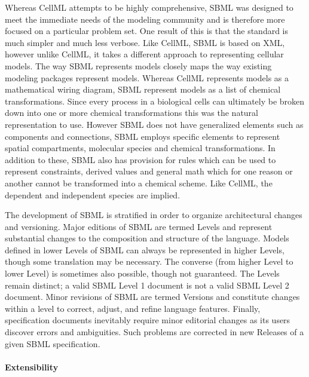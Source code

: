 Whereas CellML attempts to be highly comprehensive, SBML was designed to
meet the immediate needs of the modeling community and is therefore more
focused on a particular problem set. One result of this is that the
standard is much simpler and much less verbose. Like CellML, SBML is
based on XML, however unlike CellML, it takes a different approach to
representing cellular models. The way SBML represents models closely
maps the way existing modeling packages represent models. Whereas CellML
represents models as a mathematical wiring diagram, SBML represent
models as a list of chemical transformations. Since every process in a
biological cells can ultimately be broken down into one or more chemical
transformations this was the natural representation to use. However SBML
does not have generalized elements such as components and connections,
SBML employs specific elements to represent spatial compartments,
molecular species and chemical transformations. In addition to these,
SBML also has provision for rules which can be used to represent
constraints, derived values and general math which for one reason or
another cannot be transformed into a chemical scheme. Like CellML, the
dependent and independent species are implied.

The development of SBML is stratified in order to organize architectural
changes and versioning. Major editions of SBML are termed Levels and
represent substantial changes to the composition and structure of the
language. Models defined in lower Levels of SBML can always be
represented in higher Levels, though some translation may be necessary.
The converse (from higher Level to lower Level) is sometimes also
possible, though not guaranteed. The Levels remain distinct; a valid
SBML Level 1 document is not a valid SBML Level 2 document. Minor
revisions of SBML are termed Versions and constitute changes within a
level to correct, adjust, and refine language features. Finally,
specification documents inevitably require minor editorial changes as
its users discover errors and ambiguities. Such problems are corrected
in new Releases of a given SBML specification.

\paragraph{Extensibility}

